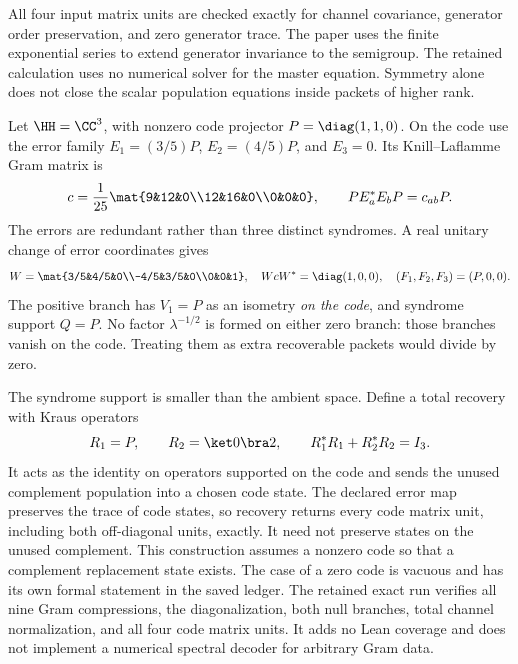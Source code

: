 All four input matrix units are checked exactly for channel covariance, generator order preservation, and zero generator trace. The paper uses the finite exponential series to extend generator invariance to the semigroup. The retained calculation uses no numerical solver for the master equation. Symmetry alone does not close the scalar population equations inside packets of higher rank.

Let $\HH=\CC^3$, with nonzero code projector $P=\diag(1,1,0)$. On the code use the error family $E_1=(3/5)P$, $E_2=(4/5)P$, and $E_3=0$. Its Knill--Laflamme Gram matrix is
\[
c=\frac1{25}\mat{9&12&0\\12&16&0\\0&0&0},
\qquad PE_a^*E_bP=c_{ab}P.
\]
The errors are redundant rather than three distinct syndromes. A real unitary change of error coordinates gives
\[
W=\mat{3/5&4/5&0\\-4/5&3/5&0\\0&0&1},
\quad WcW^*=\diag(1,0,0),
\quad(F_1,F_2,F_3)=(P,0,0).
\]
The positive branch has $V_1=P$ as an isometry \emph{on the code}, and syndrome support $Q=P$. No factor $\lambda^{-1/2}$ is formed on either zero branch: those branches vanish on the code. Treating them as extra recoverable packets would divide by zero.

The syndrome support is smaller than the ambient space. Define a total recovery with Kraus operators
\[
R_1=P,\qquad R_2=\ket0\bra2,
\qquad R_1^*R_1+R_2^*R_2=I_3.
\]
It acts as the identity on operators supported on the code and sends the unused complement population into a chosen code state. The declared error map preserves the trace of code states, so recovery returns every code matrix unit, including both off-diagonal units, exactly. It need not preserve states on the unused complement.
This construction assumes a nonzero code so that a complement replacement state exists. The case of a zero code is vacuous and has its own formal statement in the saved ledger. The retained exact run verifies all nine Gram compressions, the diagonalization, both null branches, total channel normalization, and all four code matrix units. It adds no Lean coverage and does not implement a numerical spectral decoder for arbitrary Gram data.

